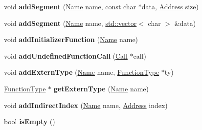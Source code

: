 \begin{DoxyCompactItemize}
\item 
\mbox{\label{classwasm_1_1_linker_object_a27d31e02ff858ec00fea131f2d05f4bb}} 
void {\bfseries add\+Segment} (\mbox{\hyperlink{structwasm_1_1_name}{Name}} name, const char $\ast$data, \mbox{\hyperlink{structwasm_1_1_address}{Address}} size)
\item 
\mbox{\label{classwasm_1_1_linker_object_aadcb369c611e452468e7b6b316ac9275}} 
void {\bfseries add\+Segment} (\mbox{\hyperlink{structwasm_1_1_name}{Name}} name, \mbox{\hyperlink{classstd_1_1vector}{std\+::vector}}$<$ char $>$ \&data)
\item 
\mbox{\label{classwasm_1_1_linker_object_aa23094d3903d5e20c12211c7c5e32533}} 
void {\bfseries add\+Initializer\+Function} (\mbox{\hyperlink{structwasm_1_1_name}{Name}} name)
\item 
\mbox{\label{classwasm_1_1_linker_object_a3ae379c233d63ea4e75355e9ebf87617}} 
void {\bfseries add\+Undefined\+Function\+Call} (\mbox{\hyperlink{classwasm_1_1_call}{Call}} $\ast$call)
\item 
\mbox{\label{classwasm_1_1_linker_object_ae78874be897f617c02aea608682ca8d0}} 
void {\bfseries add\+Extern\+Type} (\mbox{\hyperlink{structwasm_1_1_name}{Name}} name, \mbox{\hyperlink{classwasm_1_1_function_type}{Function\+Type}} $\ast$ty)
\item 
\mbox{\label{classwasm_1_1_linker_object_aa2aad640c53312aa1d5d3ae35eec2f25}} 
\mbox{\hyperlink{classwasm_1_1_function_type}{Function\+Type}} $\ast$ {\bfseries get\+Extern\+Type} (\mbox{\hyperlink{structwasm_1_1_name}{Name}} name)
\item 
\mbox{\label{classwasm_1_1_linker_object_abe788e5511032672756fe615d2940b88}} 
void {\bfseries add\+Indirect\+Index} (\mbox{\hyperlink{structwasm_1_1_name}{Name}} name, \mbox{\hyperlink{structwasm_1_1_address}{Address}} index)
\item 
\mbox{\label{classwasm_1_1_linker_object_ae3c1eff30519df0b94d5fe4a99b4580b}} 
bool {\bfseries is\+Empty} ()
\end{DoxyCompactItemize}
